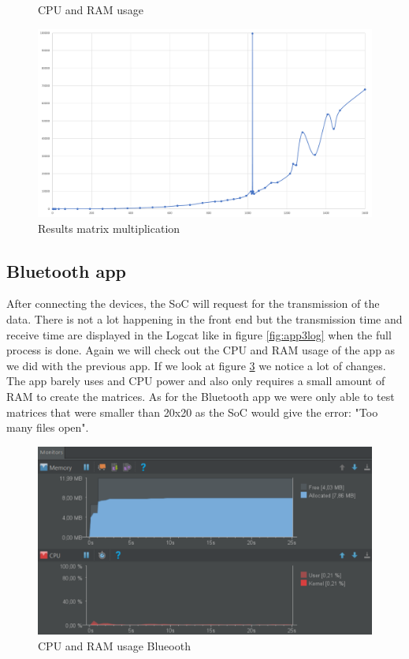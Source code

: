 \documentclass[a4paper, 11pt]{report}
\begin{document}
\begin{figure}[ht]
\begin{minipage}[t]{0.5\textwidth}
	\caption{CPU and RAM usage}\label{fig:app1usage}
	\end{minipage}
\end{figure}


\begin{figure}[ht]
\centering
\includegraphics[scale=0.35]{images/app1graph.pdf}
\caption{Results matrix multiplication}\label{fig:app1Graph}
\end{figure}



	\subsection{Bluetooth app}
After connecting the devices, the SoC will request for the transmission of the data. There is not a lot happening in the front end but the transmission time and receive time are displayed in the Logcat like in figure \ref{fig:app3log} when the full process is done. Again we will check out the CPU and RAM usage of the app as we did with the previous app. If we look at figure \ref{fig:app3usage} we notice a lot of changes. The app barely uses and CPU power and also only requires a small amount of RAM to create the matrices. As for the Bluetooth app we were only able to test matrices that were smaller than 20x20 as the SoC would give the error: "Too many files open".

\begin{figure}[ht]
\centering
\includegraphics[scale=0.3]{images/app3usage.pdf}
\caption{CPU and RAM usage Blueooth}\label{fig:app3usage}
\end{figure}
\end{document}
